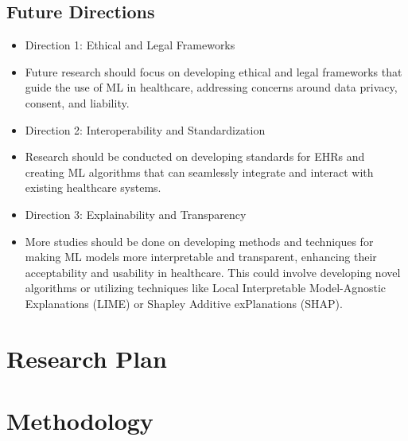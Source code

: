 \documentclass[conference]{IEEEtran}
\begin{document}
\subsection{Future Directions}
\begin{itemize}
\item Direction 1: Ethical and Legal Frameworks
\end{itemize}
\begin{itemize}
\item Future research should focus on developing ethical and legal frameworks that guide the use of ML in healthcare, addressing concerns around data privacy, consent, and liability.
\end{itemize}
\begin{itemize}
\item Direction 2: Interoperability and Standardization
\end{itemize}
\begin{itemize}
\item Research should be conducted on developing standards for EHRs and creating ML algorithms that can seamlessly integrate and interact with existing healthcare systems.
\end{itemize}
\begin{itemize}
\item Direction 3: Explainability and Transparency
\end{itemize}
\begin{itemize}
\item More studies should be done on developing methods and techniques for making ML models more interpretable and transparent, enhancing their acceptability and usability in healthcare. This could involve developing novel algorithms or utilizing techniques like Local Interpretable Model-Agnostic Explanations (LIME) or Shapley Additive exPlanations (SHAP).
\end{itemize}

\section{ Research Plan }


\section{ Methodology }
\end{document}
